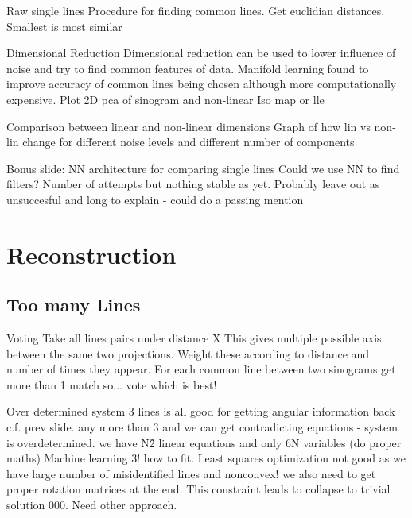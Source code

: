 \documentclass[t, 11pt]{beamer}
\begin{document}
\begin{frame}[fragile]{Raw single lines}
  Procedure for finding common lines. Get euclidian distances. Smallest is most similar
\end{frame}

\begin{frame}[fragile]{Dimensional Reduction}
  Dimensional reduction can be used to lower influence of noise and try to find common features of data.
  Manifold learning found to improve accuracy of common lines being chosen although more computationally expensive.
  Plot 2D pca of sinogram
  and non-linear Iso map or lle
\end{frame}

\begin{frame}[fragile]{Comparison between linear and non-linear dimensions}
  Graph of how lin vs non-lin change for different noise levels and different number of components
\end{frame}

\begin{frame}[fragile]{Bonus slide: NN architecture for comparing single lines}
  Could we use NN to find filters? Number of attempts but nothing stable as yet.
  Probably leave out as unsuccesful and long to explain - could do a passing mention
\end{frame}

\section{Reconstruction}
\subsection*{Too many Lines}
\begin{frame}[fragile]{Voting}
  Take all lines pairs under distance X
  This gives multiple possible axis between the same two projections. Weight these according to distance and number of times they appear.
  For each common line between two sinograms get more than 1 match so... vote which is best!
\end{frame}

\begin{frame}[fragile]{Over determined system}
  3 lines is all good for getting angular information back c.f. prev slide.
  any more than 3 and we can get contradicting equations - system is overdetermined. we have N\^2 linear equations and only 6N variables (do proper maths)
  Machine learning 3! how to fit. Least squares optimization not good as we have large number of misidentified lines and nonconvex! we also need to get proper rotation matrices at the end. This constraint leads to collapse to trivial solution 000. Need other approach.
\end{frame}
\end{document}
